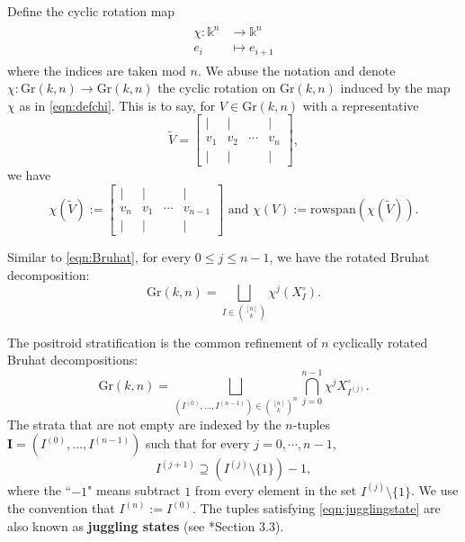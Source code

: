 \documentclass[12pt,reqno]{amsart}
\theoremstyle{definition}
\renewcommand{\k}{\mathbb{k}}
\newcommand{\gr}{\mathrm{Gr}}
\begin{document}
{Define the cyclic rotation map
\begin{align}\label{eqn:defchi}
\begin{split}
    \chi:\k^n&\longrightarrow \k^n\\
    e_i &\mapsto e_{i+1}
\end{split}
\end{align}
where the indices are taken mod $n$. We abuse the notation and denote $\chi:\gr(k,n)\rightarrow \gr(k,n)$ the cyclic rotation on $\gr(k,n)$ induced by the map $\chi$ as in \eqref{eqn:defchi}. This is to say, for $V\in \gr(k,n)$ with a representative
   \[\widetilde{V} = 
\begin{bmatrix}
    \vert & \vert & \  & \vert \\
    v_1   & v_2 & \cdots & v_n   \\
    \vert & \vert & \  & \vert
\end{bmatrix},\] 
we have
\begin{equation}\label{eqn:chi}
    \chi(\widetilde{V}) := 
    \begin{bmatrix}
        \vert & \vert & \  & \vert \\
        v_n   & v_1 & \cdots & v_{n-1}   \\
        \vert & \vert & \  & \vert
    \end{bmatrix}\text{ and } \chi(V):=\mathrm{rowspan}(\chi(\widetilde{V})).
    \end{equation}

Similar to \eqref{eqn:Bruhat}, for every $0\le j\le n-1$, we have the rotated Bruhat decomposition:
\begin{equation}
    \gr(k,n) = \bigsqcup_{I\in {[n]\choose k}} \chi^j(X_I^\circ).
\end{equation}

The positroid stratification is the common refinement of $n$ cyclically rotated Bruhat decompositions:
\begin{equation}\label{eqn:positroidstrat}
    \gr(k,n) = \bigsqcup_{(I^{(0)},\dots,I^{(n-1)})\in {[n]\choose k}^n} \bigcap_{j = 0}^{n-1} \chi^j X^\circ_{I^{(j)}}. 
\end{equation}
The strata that are not empty are indexed by the $n$-tuples $\mathbf{I} = (I^{(0)},\dots,I^{(n-1)})$ such that for every $j=0,\cdots,n-1$,
\begin{equation}\label{eqn:jugglingstate}
    I^{(j+1)} \supseteq (I^{(j)}\setminus \{1\})-1,
\end{equation}
where the ``$-1$" means subtract $1$ from every element in the set $I^{(j)}\setminus \{1\}$. We use the convention that $I^{(n)} := I^{(0)}$. 
The tuples satisfying \eqref{eqn:jugglingstate} are also known as \textbf{juggling states} (see \cite{KLS13juggling}*{Section 3.3}).

}
\end{document}
